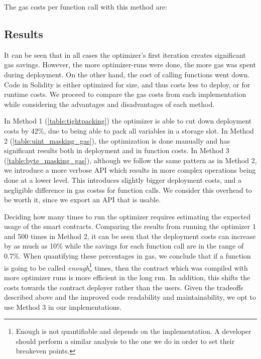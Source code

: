 The gas costs per function call with this method are: 


\subsection{Results}
It can be seen that in all cases the optimizer's first iteration creates significant gas savings. However, the more optimizer-runs were done, the more gas was spent during deployment. On the other hand, the cost of calling functions went down. Code in Solidity is either optimized for size, and thus costs less to deploy, or for runtime costs\cite{optimizer-tradeoff}. We proceed to compare the gas costs from each implementation while considering the advantages and disadvantages of each method. 

In Method 1 (\ref{table:tightpacking}) the optimizer is able to cut down deployment costs by 42\%, due to being able to pack all variables in a storage slot. In Method 2 (\ref{table:uint_masking_gas}), the optimization is done manually and has significant results both in deployment and in function costs. In Method 3 (\ref{table:byte_masking_gas}), although we follow the same pattern as in Method 2, we introduce a more verbose API which results in more complex operations being done at a lower level. This introduces slightly bigger deployment costs, and a negligible difference in gas costss for function calls. We consider this overhead to be worth it, since we export an API that is usable.  

Deciding how many times to run the optimizer requires estimating the expected usage of the smart contracts. Comparing the results from running the optimizer 1 and 500 times in Method 2, it can be seen that the deployment costs can increase by as much as 10\% while the savings for each function call are in the range of 0.7\%. When quantifying these percentages in gas, we conclude that if a function is going to be called \textit{enough}\footnote{Enough is not quantifiable and depends on the implementation. A developer should perform a similar analysis to the one we do in order to set their breakeven points.} times, then the contract which was compiled with more optimizer runs is more efficient in the long run. In addition, this shifts the costs towards the contract deployer rather than the users. Given the tradeoffs described above and the improved code readability and maintainability, we opt to use Method 3 in our implementations. 

